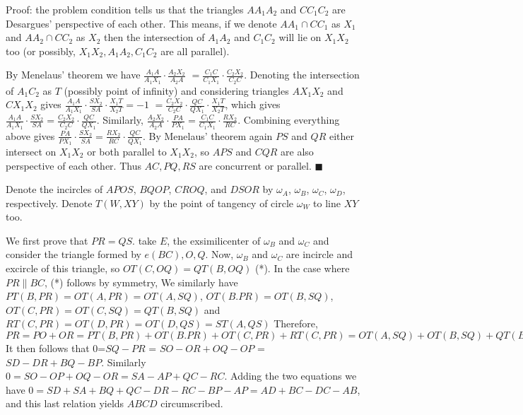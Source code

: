 \documentclass[11pt,a4paper]{article}
\begin{document}
\begin{enumerate}
Proof: the problem condition tells us that the triangles $AA_1A_2$ and $CC_1C_2$ are Desargues' perspective of each other. 
This means, if we denote $AA_1\cap CC_1$ as $X_1$ and $AA_2\cap CC_2$ as $X_2$ then the intersection of $A_1A_2$ and $C_1C_2$ will lie on $X_1X_2$ too (or possibly, $X_1X_2, A_1A_2, C_1C_2$ are all parallel). 

By Menelaus' theorem we have $\frac{A_1A}{A_1X_1}\cdot\frac{A_2X_2}{A_2A}$
$=\frac{C_1C}{C_1X_1}\cdot\frac{C_2X_2}{C_2C}$. 
Denoting the intersection of $A_1C_2$ as $T$ (possibly point of infinity) and considering triangles $AX_1X_2$ and $CX_1X_2$ gives
$\frac{A_1A}{A_1X_1}\cdot\frac{SX_2}{SA}\cdot\frac{X_1T}{X_2T}=-1$
$=\frac{C_2X_2}{C_2C}\cdot\frac{QC}{QX_1}\cdot\frac{X_1T}{X_2T}$, 
which gives 
$\frac{A_1A}{A_1X_1}\cdot\frac{SX_2}{SA}=\frac{C_2X_2}{C_2C}\cdot\frac{QC}{QX_1}$. 
Similarly, $\frac{A_2X_2}{A_2A}\cdot\frac{PA}{PX_1}=\frac{C_1C}{C_1X_1}\cdot\frac{RX_2}{RC}$. 
Combining everything above gives 
$\frac{PA}{PX_1}\cdot\frac{SX_2}{SA}=\frac{RX_2}{RC}\cdot\frac{QC}{QX_1}$. 
By Menelaus' theorem again $PS$ and $QR$ either intersect on $X_1X_2$ or both parallel to $X_1X_2$, so $APS$ and $CQR$ are also perspective of each other. 
Thus $AC, PQ, RS$ are concurrent or parallel. $\blacksquare$

Denote the incircles of  $APOS$, $BQOP$, $CROQ$, and $DSOR$ by $\omega_A$, $\omega_B$, $\omega_C$, $\omega_D$, respectively. Denote $T(W, XY)$ by the point of tangency of circle $\omega_W$ to line $XY$ too.

We first prove that $PR=QS$. take $E$, the exsimilicenter of $\omega_B$ and $\omega_C$ and consider the triangle formed by $e(BC), O, Q$. Now, $\omega_B$ and $\omega_C$ are incircle and excircle of this triangle, so $OT(C, OQ)=QT(B,OQ)$ (*). 
In the case where $PR\parallel BC$, (*) follows by symmetry, We similarly have $PT(B,PR)=OT(A,PR)=OT(A,SQ)$, $OT(B.PR)=OT(B,SQ)$, $OT(C,PR)=OT(C,SQ)=QT(B,SQ)$ and $RT(C,PR)=OT(D,PR)=OT(D,QS)=ST(A,QS)$ Therefore, $PR=PO+OR=PT(B,PR)+OT(B.PR)+OT(C,PR)+RT(C,PR)=OT(A,SQ)+OT(B,SQ)+QT(B,SQ)+ST(A,QS)=SO+OQ=QS.$ It then follows that 0=$SQ-PR$ = $SO-OR+OQ-OP$ = $SD-DR+BQ-BP.$ Similarly $0=SO-OP+OQ-OR=SA-AP+QC-RC$. Adding the two equations we have $0=SD+SA+BQ+QC-DR-RC-BP-AP=AD+BC-DC-AB$, and this last relation yields $ABCD$ circumscribed.


\end{enumerate}
\end{document}
